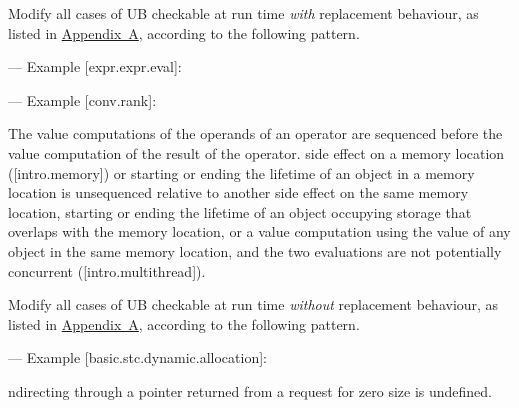 Modify all cases of UB checkable at run time \emph{with} replacement behaviour, as listed in \hyperref[appendix]{Appendix~A}, according to the following pattern. 

--- Example [expr.expr.eval]:

\begin{adjustwidth}{0.5cm}{0.5cm}
\end{adjustwidth}

--- Example [conv.rank]:

\begin{adjustwidth}{0.5cm}{0.5cm}
The value computations of the operands of an operator are sequenced before the value computation of the result of the operator.   side effect on a memory location ([intro.memory]) or starting or ending the lifetime of an object in a memory location is unsequenced relative to another side effect on the same memory location, starting or ending the lifetime of an object occupying storage that overlaps with the memory location, or a value computation using the value of any object in the same memory location, and the two evaluations are not potentially concurrent ([intro.multithread]).
\end{adjustwidth}

Modify all cases of UB checkable at run time \emph{without} replacement behaviour, as listed in \hyperref[appendix]{Appendix~A}, according to the following pattern. 

--- Example [basic.stc.dynamic.allocation]:

\begin{adjustwidth}{0.5cm}{0.5cm}
ndirecting through a pointer  returned from a request for zero size is undefined.
\end{adjustwidth}


